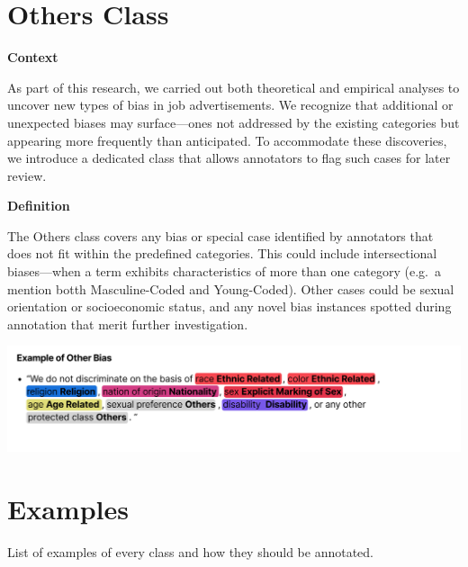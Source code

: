 \documentclass[
]{book}
\begin{document}
\chapter{Others Class}\label{others}

\textbf{Context}

As part of this research, we carried out both theoretical and empirical analyses to uncover new types of bias in job advertisements. We recognize that additional or unexpected biases may surface---ones not addressed by the existing categories but appearing more frequently than anticipated. To accommodate these discoveries, we introduce a dedicated class that allows annotators to flag such cases for later review.

\textbf{Definition}

The Others class covers any bias or special case identified by annotators that does not fit within the predefined categories. This could include intersectional biases---when a term exhibits characteristics of more than one category (e.g.~a mention botth Masculine-Coded and Young-Coded). Other cases could be sexual orientation or socioeconomic status, and any novel bias instances spotted during annotation that merit further investigation.

\includegraphics{images/Others.png}

\chapter{Examples}\label{examples}

List of examples of every class and how they should be annotated.
\end{document}

